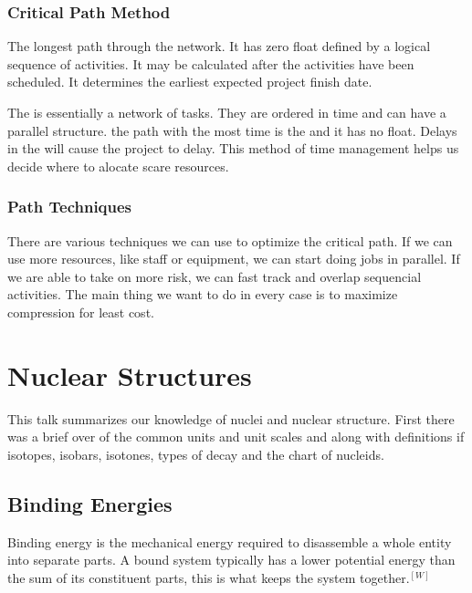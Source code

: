 \documentclass[english, 11pt]{article}
\begin{document}
      \subsubsection{Critical Path Method} \label{cpm}
        \begin{defn} \label{cp}
          The longest path through the network. It has zero float defined by a logical sequence of activities. It may be calculated after the activities have been scheduled. It determines the earliest expected project finish date. 
        \end{defn}

        The  is essentially a network of tasks. They are ordered in time and can have a parallel structure. the path with the most time is the  and it has no float. Delays in the  will cause the project to delay. This method of time management helps us decide where to alocate scare resources.\\

      \subsubsection{Path Techniques}
        There are various techniques we can use to optimize the critical path. If we can use more resources, like staff or equipment, we can start doing jobs in parallel. If we are able to take on more risk, we can fast track and overlap sequencial activities. The main thing we want to do in every case is to maximize compression for least cost.

    \newpage

    \section{Nuclear Structures}
        This talk summarizes our knowledge of nuclei and nuclear structure. First there was a brief over of the common units and unit scales and along with definitions if isotopes, isobars, isotones, types of decay and the chart of nucleids. 

      \subsection{Binding Energies}

      \begin{defn}\label{be}
        Binding energy is the mechanical energy required to disassemble a whole entity into separate parts. A bound system typically has a lower potential energy than the sum of its constituent parts, this is what keeps the system together.$^{[W]}$ 
      \end{defn}
\end{document}
